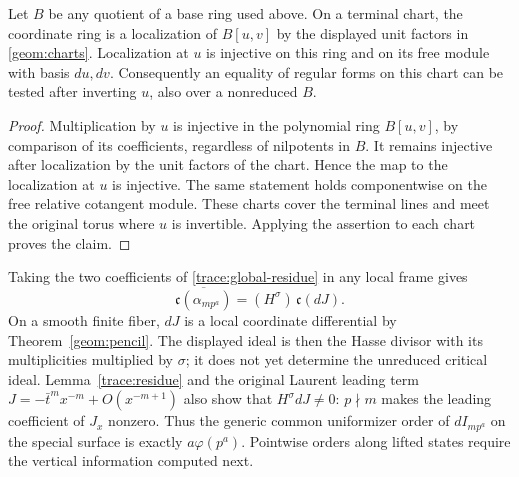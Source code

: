 \begin{lemma}
\label{trace:chart-injection}
Let $B$ be any quotient of a base ring used above. On a terminal chart,
the coordinate ring is a localization of $B[u,v]$ by the displayed
unit factors in \eqref{geom:charts}. Localization at $u$ is injective
on this ring and on its free module with basis $du,dv$.
Consequently an equality of regular forms on this chart can be tested
after inverting $u$, also over a nonreduced $B$.
\end{lemma}

\begin{proof}
Multiplication by $u$ is injective in the polynomial ring $B[u,v]$,
by comparison of its coefficients, regardless of nilpotents in $B$.
It remains injective after localization by the unit factors of the chart.
Hence the map to the localization at $u$ is injective. The same statement
holds componentwise on the free relative cotangent module.
These charts cover the terminal lines and meet the original torus where
$u$ is invertible. Applying the assertion to each chart proves the claim.
\end{proof}

Taking the two coefficients of \eqref{trace:global-residue} in any local
frame gives
\[
 \overline{\mathfrak c(\alpha_{mp^a})}
 =(H^\sigma)\,\mathfrak c(dJ).
\]
On a smooth finite fiber, $dJ$ is a local coordinate differential by
Theorem~\ref{geom:pencil}. The displayed ideal is then the Hasse
divisor with its multiplicities multiplied by $\sigma$; it does not yet
determine the unreduced critical ideal. Lemma~\ref{trace:residue} and
the original Laurent leading term
$J=-\bar t^m x^{-m}+O(x^{-m+1})$ also show that $H^\sigma dJ\ne0$:
$p\nmid m$ makes the leading coefficient of $J_x$ nonzero.
Thus the generic common uniformizer order of $dI_{mp^a}$ on the special
surface is exactly $a\varphi(p^a)$. Pointwise orders along lifted states
require the vertical information computed next.
